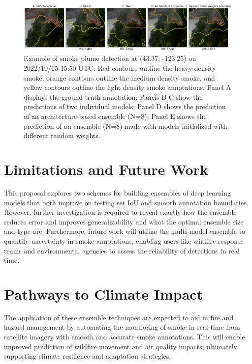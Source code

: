 \documentclass{article}
\begin{document}
\begin{figure}[h]
    \centering
    \includegraphics[width=\textwidth]{ensemble_panel_tinypaper.png}
    \caption{Example of smoke plume detection at (43.37, -123.25) on 2022/10/15 15:50 UTC. Red contours outline the heavy density smoke, orange contours outline the medium density smoke, and yellow contours outline the light density smoke annotations. Panel A displays the ground truth annotation; Panels B-C show the predictions of two individual models; Panel D shows the prediction of an architecture-based ensemble (N=8); Panel E shows the prediction of an ensemble (N=8) made with models initialized with different random weights.}
    \label{fig:ensemble_panel}
\end{figure}
\section{Limitations and Future Work} This proposal explores two schemes for building ensembles of deep learning models that both improve on testing set IoU and smooth annotation boundaries. However, further investigation is required to reveal exactly how the ensemble reduces error and improves generalizability and what the optimal ensemble size and type are. Furthermore, future work will utilize the multi-model ensemble to quantify uncertainty in smoke annotations, enabling users like wildfire response teams and environmental agencies to assess the reliability of detections in real time. 

\section{Pathways to Climate Impact} The application of these ensemble techniques are expected to aid in fire and hazard management by automating the monitoring of smoke in real-time from satellite imagery with smooth and accurate smoke annotations. This will enable improved prediction of wildfire movement and air quality impacts, ultimately supporting climate resilience and adaptation strategies.  


 
\end{document}
